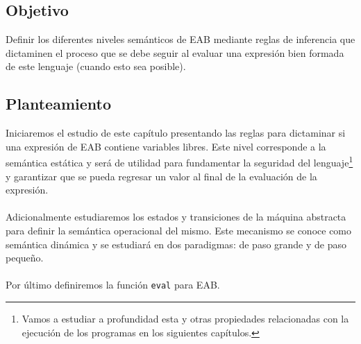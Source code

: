     \subsection*{Objetivo}
        Definir los diferentes niveles semánticos de \textsf{EAB} mediante reglas de inferencia que dictaminen el proceso que se 
        debe seguir al evaluar una expresión bien formada de este lenguaje (cuando esto sea posible).

    \subsection*{Planteamiento}
        Iniciaremos el estudio de este capítulo presentando las reglas para dictaminar si una expresión de \textsf{EAB} contiene variables libres. Este nivel corresponde a la semántica estática y será de utilidad para fundamentar la seguridad del lenguaje\footnote{Vamos a estudiar a profundidad esta y otras propiedades relacionadas con la ejecución de los programas en los siguientes capítulos.} y garantizar que se pueda regresar un valor al final de la evaluación de la expresión.\\\\
Adicionalmente estudiaremos los estados y transiciones de la máquina abstracta para definir la semántica operacional del mismo. Este mecanismo se conoce como semántica dinámica y se estudiará en dos paradigmas: de paso grande y de paso pequeño.\\\\
 Por último definiremos la función \texttt{eval} para \textsf{EAB}.

